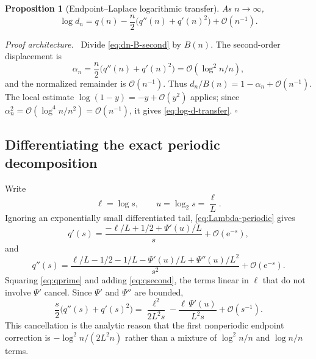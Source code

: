 \documentclass[11pt,oneside]{article}
\newtheorem{proposition}[theorem]{Proposition}
\theoremstyle{definition}
\theoremstyle{remark}
\newcommand{\e}{\mathrm e}
\newcommand{\bigO}{\mathcal O}
\newenvironment{proofidea}{\par\smallskip\noindent\textit{Proof architecture.}\ }{\hfill$\square$\par\smallskip}
\begin{document}
\begin{proposition}[Endpoint--Laplace logarithmic transfer]
\label{prop:endpoint-laplace-transfer}
As $n\to\infty$,
\begin{equation}
 \boxed{
 \log d_n=q(n)-\frac n2\bigl(q''(n)+q'(n)^2\bigr)
 +\bigO(n^{-1}).}                                          \label{eq:log-d-transfer}
\end{equation}
\end{proposition}

\begin{proofidea}
Divide \eqref{eq:dn-B-second} by $B(n)$.  The second-order displacement is
\begin{equation*}
 \alpha_n=\frac n2\bigl(q''(n)+q'(n)^2\bigr)
          =\bigO(\log^2n/n),
\end{equation*}
and the normalized remainder is $\bigO(n^{-1})$.  Thus
$d_n/B(n)=1-\alpha_n+\bigO(n^{-1})$.  The local estimate
$\log(1-y)=-y+\bigO(y^2)$ applies; since
$\alpha_n^2=\bigO(\log^4n/n^2)=\bigO(n^{-1})$, it gives
\eqref{eq:log-d-transfer}.
\end{proofidea}

\subsection{Differentiating the exact periodic decomposition}

Write
\begin{equation}
 \ell=\log s,
 \qquad
 u=\log_2s=\frac\ell L.                                    \label{eq:ell-u}
\end{equation}
Ignoring an exponentially small differentiated tail, \eqref{eq:Lambda-periodic} gives
\begin{equation}
 q'(s)=\frac{-\ell/L+1/2+\Psi'(u)/L}{s}+\bigO(\e^{-s}),     \label{eq:qprime}
\end{equation}
and
\begin{equation}
 q''(s)=\frac{\ell/L-1/2-1/L-\Psi'(u)/L+\Psi''(u)/L^2}{s^2}
 +\bigO(\e^{-s}).                                           \label{eq:qsecond}
\end{equation}
Squaring \eqref{eq:qprime} and adding \eqref{eq:qsecond}, the terms linear in $\ell$ that do
not involve $\Psi'$ cancel.  Since $\Psi'$ and $\Psi''$ are bounded,
\begin{equation}
 \frac s2\bigl(q''(s)+q'(s)^2\bigr)
 =\frac{\ell^2}{2L^2s}-
   \frac{\ell\,\Psi'(u)}{L^2s}+\bigO(s^{-1}).              \label{eq:cumulant-expansion}
\end{equation}
This cancellation is the analytic reason that the first nonperiodic endpoint correction is
$-\log^2n/(2L^2n)$ rather than a mixture of $\log^2n/n$ and $\log n/n$ terms.
\end{document}
